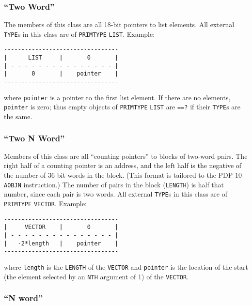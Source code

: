 \documentclass[a4paper]{scrbook}
\begin{document}
\subsubsection*{\texorpdfstring{``Two Word''}{Two Word}}\label{two-word}

The members of this class are all 18-bit pointers to list elements. All external \texttt{TYPE}s in this class are of
\texttt{PRIMTYPE} \texttt{LIST}. Example:

\begin{verbatim}
---------------------------------
|      LIST     |       0       |
| - - - - - - - - - - - - - - - |
|       0       |    pointer    |
---------------------------------
\end{verbatim}

where \texttt{pointer} is a pointer to the first list element. If there are no elements, \texttt{pointer} is zero; thus
empty objects of \texttt{PRIMTYPE} \texttt{LIST} are \texttt{==?}  if their \texttt{TYPE}s are the
same.

\subsubsection*{\texorpdfstring{``Two N Word''}{Two N Word}}\label{two-n-word}

Members of this class are all ``counting pointers'' to blocks of two-word pairs. The right half of a counting pointer is an
address, and the left half is the negative of the number of 36-bit words in the block. (This format is tailored to the
PDP-10 \texttt{AOBJN} instruction.) The number of pairs in the block (\texttt{LENGTH}) is half that number, since each pair
is two words. All external \texttt{TYPE}s in this class are of \texttt{PRIMTYPE} \texttt{VECTOR}.
Example:

\begin{verbatim}
---------------------------------
|     VECTOR    |       0       |
| - - - - - - - - - - - - - - - |
|   -2*length   |    pointer    |
---------------------------------
\end{verbatim}

where \texttt{length} is the \texttt{LENGTH} of the \texttt{VECTOR} and \texttt{pointer} is the location of the start (the
element selected by an \texttt{NTH} argument of 1) of the \texttt{VECTOR}.

\subsubsection*{\texorpdfstring{``N word''}{N word}}\label{n-word}
\end{document}
